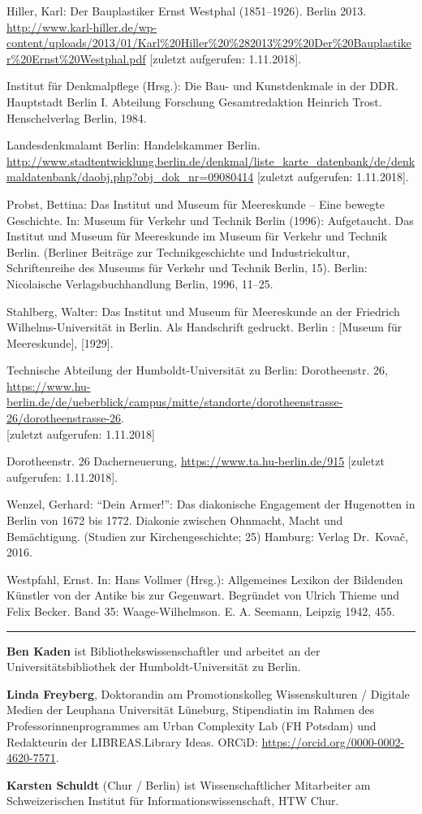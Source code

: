 \documentclass[a4paper,
fontsize=11pt,
oneside,
numbers=noperiodatend,
parskip=half-,
bibliography=totoc,
final
]{scrartcl}
\begin{document}
Hiller, Karl: Der Bauplastiker Ernst Westphal (1851--1926). Berlin 2013.
\url{http://www.karl-hiller.de/wp-content/uploads/2013/01/Karl\%20Hiller\%20\%282013\%29\%20Der\%20Bauplastiker\%20Ernst\%20Westphal.pdf}
{[}zuletzt aufgerufen: 1.11.2018{]}.

Institut für Denkmalpflege (Hrsg.): Die Bau- und Kunstdenkmale in der
DDR. Hauptstadt Berlin I. Abteilung Forschung Gesamtredaktion Heinrich
Trost. Henschelverlag Berlin, 1984.

Landesdenkmalamt Berlin: Handelskammer Berlin.
\url{http://www.stadtentwicklung.berlin.de/denkmal/liste_karte_datenbank/de/denkmaldatenbank/daobj.php?obj_dok_nr=09080414}
{[}zuletzt aufgerufen: 1.11.2018{]}.

Probst, Bettina: Das Institut und Museum für Meereskunde -- Eine bewegte
Geschichte. In: Museum für Verkehr und Technik Berlin (1996):
Aufgetaucht. Das Institut und Museum für Meereskunde im Museum für
Verkehr und Technik Berlin. (Berliner Beiträge zur Technikgeschichte und
Industriekultur, Schriftenreihe des Museums für Verkehr und Technik
Berlin, 15). Berlin: Nicolaische Verlagsbuchhandlung Berlin, 1996,
11--25.

Stahlberg, Walter: Das Institut und Museum für Meereskunde an der
Friedrich Wilhelms-Univer\-sität in Berlin. Als Handschrift gedruckt.
Berlin : {[}Museum für Meereskunde{]}, {[}1929{]}.

Technische Abteilung der Humboldt-Universität zu Berlin: Dorotheenstr.
26,
\url{https://www.hu-berlin.de/de/ueberblick/campus/mitte/standorte/dorotheenstrasse-26/dorotheenstrasse-26}.\\ 
{[}zuletzt aufgerufen: 1.11.2018{]}

Dorotheenstr. 26 Dacherneuerung, \href{https://www.ta.hu-berlin.de/915}{https://www.ta.hu-berlin.de/915}
{[}zuletzt aufgerufen: 1.11.2018{]}.

Wenzel, Gerhard: \enquote{Dein Armer!}: Das diakonische Engagement der
Hugenotten in Berlin von 1672 bis 1772. Diakonie zwischen Ohnmacht,
Macht und Bemächtigung. (Studien zur Kirchengeschichte; 25) Hamburg:
Verlag Dr.~Kovač, 2016.

Westpfahl, Ernst. In: Hans Vollmer (Hrsg.): Allgemeines Lexikon der
Bildenden Künstler von der Antike bis zur Gegenwart. Begründet von
Ulrich Thieme und Felix Becker. Band 35: Waage-Wilhelmson. E. A.
Seemann, Leipzig 1942, 455.

\begin{center}\rule{0.5\linewidth}{\linethickness}\end{center}

\textbf{Ben Kaden} ist Bibliothekswissenschaftler und arbeitet an der
Universitätsbibliothek der Hum\-boldt-Universität zu Berlin.

\textbf{Linda Freyberg}, Doktorandin am Promotionskolleg Wissenskulturen
/ Digitale Medien der Leuphana Universität Lüneburg, Stipendiatin im
Rahmen des Professorinnenprogrammes am Urban Complexity Lab (FH Potsdam)
und Redakteurin der LIBREAS.Library Ideas. ORCiD:
\url{https://orcid.org/0000-0002-4620-7571}.

\textbf{Karsten Schuldt} (Chur / Berlin) ist Wissenschaftlicher
Mitarbeiter am Schweizerischen Institut für Informationswissenschaft,
HTW Chur.
\end{document}
